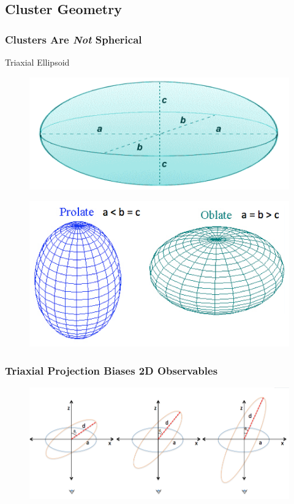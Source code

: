\documentclass[hyperref={pdfpagelabels=false}]{beamer}
\begin{document}
\subsection{Cluster Geometry}
\begin{frame}
\frametitle{Clusters Are {\em Not} Spherical}

    \centerline{Triaxial Ellipsoid}
    \begin{figure}
      \includegraphics[height=0.25\textheight]{triaxial_ellipsoid.png}
    \end{figure}  
   \begin{figure}
      \includegraphics[height=0.4\textheight]{ellipsoids2.png}
    \end{figure}  
\end{frame}

\begin{frame}
  \frametitle{Triaxial Projection Biases 2D Observables}
  \begin{figure}
    \includegraphics[width=\textwidth]{degeneracy.png}
  \end{figure}  
\end{frame}
\end{document}
